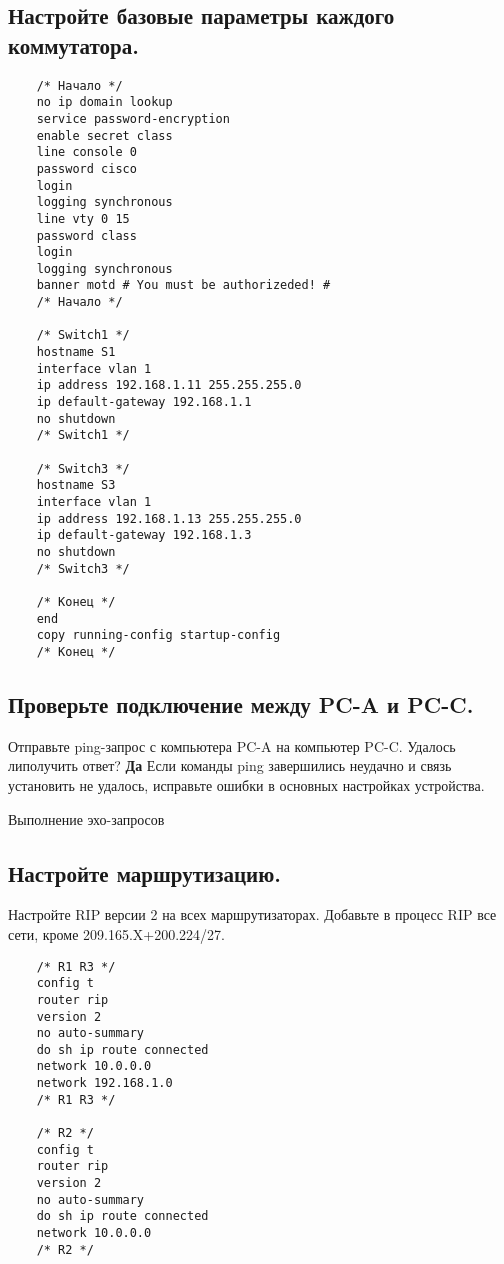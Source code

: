 \subsection{ Настройте базовые параметры каждого коммутатора.}

\begin{verbatim}
    /* Начало */
    no ip domain lookup
    service password-encryption
    enable secret class
    line console 0
    password cisco
    login
    logging synchronous
    line vty 0 15
    password class
    login
    logging synchronous
    banner motd # You must be authorizeded! #
    /* Начало */

    /* Switch1 */
    hostname S1
    interface vlan 1
    ip address 192.168.1.11 255.255.255.0
    ip default-gateway 192.168.1.1
    no shutdown
    /* Switch1 */

    /* Switch3 */
    hostname S3
    interface vlan 1
    ip address 192.168.1.13 255.255.255.0
    ip default-gateway 192.168.1.3
    no shutdown
    /* Switch3 */

    /* Конец */
    end
    copy running-config startup-config
    /* Конец */
\end{verbatim}

\subsection{Проверьте подключение между PC-A и PC-C.}

Отправьте ping-запрос с компьютера PC-A на компьютер PC-C. Удалось липолучить ответ? \textbf{Да}
Если команды ping завершились неудачно и связь установить не удалось, исправьте ошибки
в основных настройках устройства.


\begin{image}
    \caption{Выполнение эхо-запросов}
\end{image}

\subsection{Настройте маршрутизацию.}
Настройте RIP версии 2 на всех маршрутизаторах.
Добавьте в процесс RIP все сети, кроме
209.165.X+200.224/27.

\begin{verbatim}
    /* R1 R3 */
    config t
    router rip
    version 2
    no auto-summary
    do sh ip route connected
    network 10.0.0.0
    network 192.168.1.0
    /* R1 R3 */

    /* R2 */
    config t
    router rip
    version 2
    no auto-summary
    do sh ip route connected
    network 10.0.0.0
    /* R2 */
\end{verbatim}

